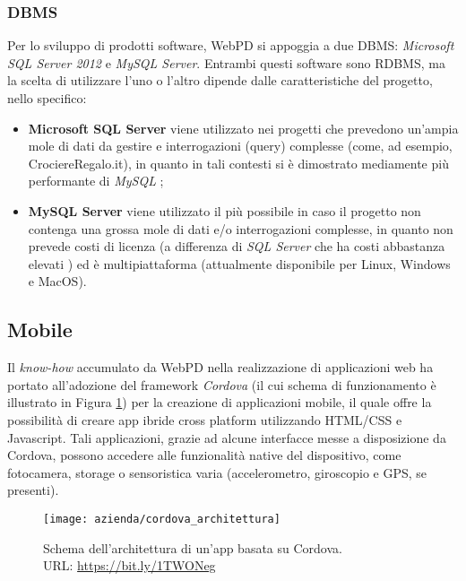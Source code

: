 \subsubsection{DBMS}
Per lo sviluppo di prodotti software, WebPD si appoggia a due \gls{DBMS}: \textit{Microsoft SQL Server 2012} e \textit{MySQL Server}. Entrambi questi software sono \gls{RDBMS}, ma la scelta di utilizzare l'uno o l'altro dipende dalle caratteristiche del progetto, nello specifico: 
\begin{itemize}
	\item \textbf{Microsoft SQL Server} viene utilizzato nei progetti che prevedono un'ampia mole di dati da gestire e interrogazioni (query) complesse (come, ad esempio, CrociereRegalo.it), in quanto in tali contesti si è dimostrato mediamente più performante di \textit{MySQL}
	\cite{site:sqlcomparison};
	\item \textbf{MySQL Server} viene utilizzato il più possibile in caso il progetto non contenga una grossa mole di dati e/o interrogazioni complesse, in quanto non prevede costi di licenza (a differenza di \textit{SQL Server} che ha costi abbastanza elevati \cite{site:sqlserverpricing}) ed è multipiattaforma (attualmente disponibile per Linux, Windows e MacOS).
\end{itemize}

\subsection{Mobile}
Il \textit{know-how} accumulato da WebPD nella realizzazione di applicazioni web ha portato all'adozione del framework \textit{Cordova} (il cui schema di funzionamento è illustrato in Figura \ref{figura:funzionamento-cordova}) per la creazione di applicazioni mobile, il quale offre la possibilità di creare app ibride cross platform utilizzando HTML/CSS e Javascript. Tali applicazioni, grazie ad alcune interfacce messe a disposizione da Cordova, possono accedere alle funzionalità native del dispositivo, come fotocamera, storage o sensoristica varia (accelerometro, giroscopio e GPS, se presenti).

\begin{figure}[!h] 
	\centering 
	\texttt{[image: azienda/cordova\_architettura]} 
	\caption{Schema dell'architettura di un'app basata su Cordova.\\URL: \url{https://bit.ly/1TWONeg}}
	\label{figura:funzionamento-cordova}
\end{figure}

